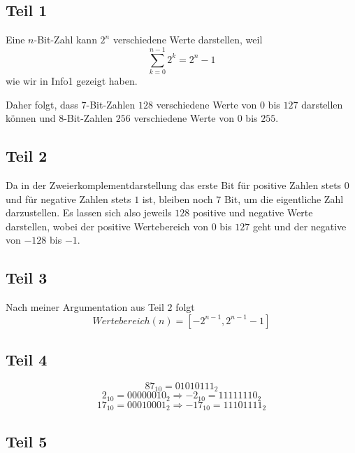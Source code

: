 \documentclass[10pt,a4paper]{article}
\begin{document}
\subsection*{Teil 1}

Eine $n$-Bit-Zahl kann $2^{n}$ verschiedene Werte darstellen, weil
\begin{equation}
\sum_{k = 0}^{n - 1} 2^{k} = 2^n - 1
\end{equation}
wie wir in Info1 gezeigt haben.

Daher folgt, dass $7$-Bit-Zahlen $128$ verschiedene Werte von $0$ bis $127$ darstellen können und $8$-Bit-Zahlen $256$ verschiedene Werte von $0$ bis $255$.

\subsection*{Teil 2}

Da in der Zweierkomplementdarstellung das erste Bit für positive Zahlen stets $0$ und für negative Zahlen stets $1$ ist, bleiben noch $7$ Bit, um die eigentliche Zahl darzustellen.
Es lassen sich also jeweils $128$ positive und negative Werte darstellen, wobei der positive Wertebereich von $0$ bis $127$ geht und der negative von $-128$ bis $-1$.

\subsection*{Teil 3}

Nach meiner Argumentation aus Teil $2$ folgt
\begin{equation}
Wertebereich(n) = [-2^{n - 1}, 2^{n - 1} - 1]
\end{equation}

\subsection*{Teil 4}

\begin{equation}
87_{10} = 01010111_{2}
\end{equation}
\begin{equation}
2_{10} = 00000010_{2} \Rightarrow -2_{10} = 11111110_{2}
\end{equation}
\begin{equation}
17_{10} = 00010001_{2} \Rightarrow -17_{10} = 11101111_{2}
\end{equation}

\subsection*{Teil 5}
\end{document}
